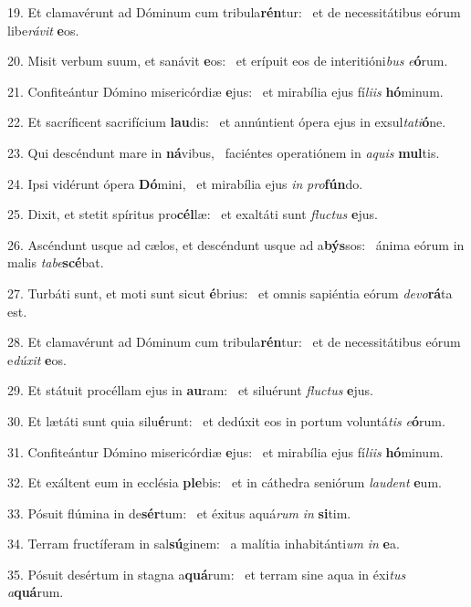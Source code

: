 19. Et clamavérunt ad Dóminum cum tribula\textbf{rén}tur: \ast\  et de necessitátibus eórum libe\textit{rá}\textit{vit} \textbf{e}os.\

20. Misit verbum suum, et sanávit \textbf{e}os: \ast\  et erípuit eos de interitióni\textit{bus} \textit{e}\textbf{ó}rum.\

21. Confiteántur Dómino misericórdiæ \textbf{e}jus: \ast\  et mirabília ejus fí\textit{li}\textit{is} \textbf{hó}minum.\

22. Et sacríficent sacrifícium \textbf{lau}dis: \ast\  et annúntient ópera ejus in exsul\textit{ta}\textit{ti}\textbf{ó}ne.\

23. Qui descéndunt mare in \textbf{ná}vibus, \ast\  faciéntes operatiónem in \textit{a}\textit{quis} \textbf{mul}tis.\

24. Ipsi vidérunt ópera \textbf{Dó}mini, \ast\  et mirabília ejus \textit{in} \textit{pro}\textbf{fún}do.\

25. Dixit, et stetit spíritus pro\textbf{cél}læ: \ast\  et exaltáti sunt \textit{fluc}\textit{tus} \textbf{e}jus.\

26. Ascéndunt usque ad cælos, et descéndunt usque ad a\textbf{býs}sos: \ast\  ánima eórum in malis \textit{ta}\textit{be}\textbf{scé}bat.\

27. Turbáti sunt, et moti sunt sicut \textbf{é}brius: \ast\  et omnis sapiéntia eórum \textit{de}\textit{vo}\textbf{rá}ta est.\

28. Et clamavérunt ad Dóminum cum tribula\textbf{rén}tur: \ast\  et de necessitátibus eórum e\textit{dú}\textit{xit} \textbf{e}os.\

29. Et státuit procéllam ejus in \textbf{au}ram: \ast\  et siluérunt \textit{fluc}\textit{tus} \textbf{e}jus.\

30. Et lætáti sunt quia silu\textbf{é}runt: \ast\  et dedúxit eos in portum voluntá\textit{tis} \textit{e}\textbf{ó}rum.\

31. Confiteántur Dómino misericórdiæ \textbf{e}jus: \ast\  et mirabília ejus fí\textit{li}\textit{is} \textbf{hó}minum.\

32. Et exáltent eum in ecclésia \textbf{ple}bis: \ast\  et in cáthedra seniórum \textit{lau}\textit{dent} \textbf{e}um.\

33. Pósuit flúmina in de\textbf{sér}tum: \ast\  et éxitus aquá\textit{rum} \textit{in} \textbf{si}tim.\

34. Terram fructíferam in sal\textbf{sú}ginem: \ast\  a malítia inhabitánti\textit{um} \textit{in} \textbf{e}a.\

35. Pósuit desértum in stagna a\textbf{quá}rum: \ast\  et terram sine aqua in éxi\textit{tus} \textit{a}\textbf{quá}rum.\

